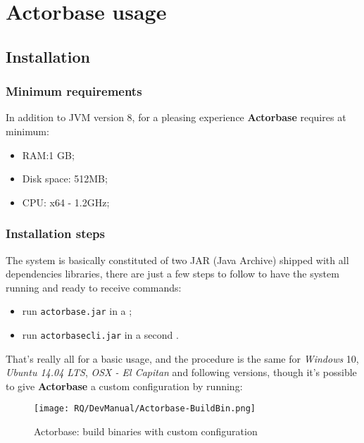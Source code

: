 \documentclass{scalatekids-article}
\begin{document}


\section{Actorbase usage}

\subsection{Installation}

\subsubsection{Minimum requirements}

In addition to JVM version 8, for a pleasing experience \textbf{Actorbase} requires at minimum:
\begin{itemize}
\item RAM:\@1 GB;\@
\item Disk space: 512MB;\@
\item CPU: x64 - 1.2GHz;
\end{itemize}

\subsubsection{Installation steps}

The system is basically constituted of two JAR (Java Archive) shipped with all
dependencies libraries, there are just a few steps to follow to have the system
running and ready to receive commands:
\begin{itemize}
\item run \verb=actorbase.jar= in a ;
\item run \verb=actorbasecli.jar= in a second .
\end{itemize}
That's really all for a basic usage, and the procedure is the same for
\textit{Windows} 10, \textit{Ubuntu 14.04 LTS}, \textit{OSX - El
  Capitan} and following versions, though it's possible to give \textbf{Actorbase} a custom configuration by
running:

\begin{figure}[H]
  \begin{center}
    \texttt{[image: RQ/DevManual/Actorbase-BuildBin.png]}
    \caption{Actorbase: build binaries with custom configuration}
  \end{center}
\end{figure}
\end{document}
